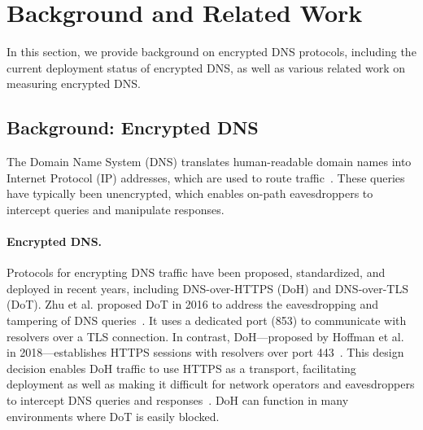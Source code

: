 \section{Background and Related Work}\label{sec:background}

In this section, we provide background on encrypted DNS protocols, including
the current deployment status of encrypted DNS, as well as various related
work on measuring encrypted DNS.

\subsection{Background: Encrypted DNS}

The Domain Name System (DNS) translates human-readable domain names into
Internet Protocol (IP) addresses, which are used to route
traffic~\cite{rfc1035}.  These queries have typically been unencrypted, which
enables on-path eavesdroppers to intercept queries and manipulate responses.


\paragraph{Encrypted DNS.}
Protocols for encrypting DNS traffic have been proposed, standardized, and
deployed in recent years, including DNS-over-HTTPS (DoH) and DNS-over-TLS
(DoT).  Zhu et al. proposed DoT in 2016 to address the eavesdropping and
tampering of DNS queries~\cite{zhu2015connection}.  It uses a dedicated port (853)
to communicate with resolvers over a TLS connection.  In contrast,
DoH---proposed by Hoffman et al. in 2018---establishes HTTPS sessions with
resolvers over port 443~\cite{rfc8484}.  This design decision enables
DoH traffic to use HTTPS as a transport, facilitating deployment as well as
making it difficult for network operators and eavesdroppers to intercept DNS
queries and responses~\cite{boettger2019empirical}. DoH can function in many
environments where DoT is easily blocked.

